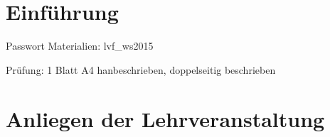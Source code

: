 \newcommand{\customDir}{../}








%



\maketitle
\newpage
\tableofcontents
\newpage

\chapter*{Einführung}

Passwort Materialien: lvf\_ws2015

Prüfung: 1 Blatt A4 hanbeschrieben, doppelseitig beschrieben

\chapter{Anliegen der Lehrveranstaltung}

